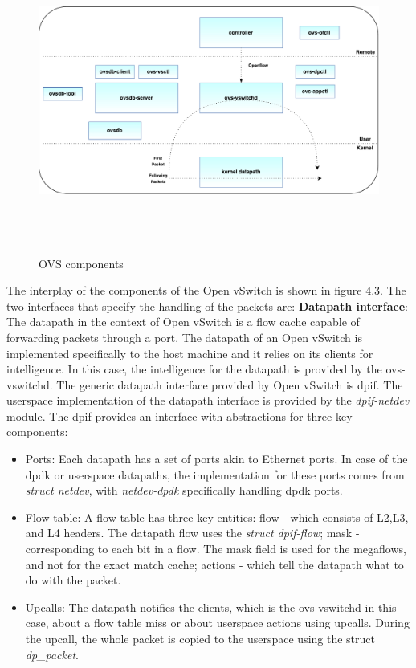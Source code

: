  \begin{figure}[H] 
 	\centering   
	\caption{OVS components}
	\includegraphics[height=10cm]{kernaldatapath.pdf}
\end{figure}

The interplay of the components of the Open vSwitch is shown in figure 4.3. The two interfaces that specify the handling of the packets are:\newline
\textbf{Datapath interface}: The datapath in the context of Open vSwitch is a flow cache capable of forwarding packets through a port. The datapath of an Open vSwitch is implemented specifically to the host machine and it relies on its clients for intelligence. In this case, the intelligence for the datapath is provided by the ovs-vswitchd. The generic datapath interface provided by Open vSwitch is dpif. The userspace implementation of the datapath interface is provided by the \textit{dpif-netdev} module. The dpif provides an interface with abstractions for three key components:
\begin{itemize}
	\item Ports: Each datapath has a set of ports akin to Ethernet ports. In case of the dpdk or userspace datapaths, the implementation for these ports comes from \textit{struct netdev}, with \textit{netdev-dpdk} specifically handling dpdk ports.
	\item Flow table: A flow table has three key entities: flow - which consists of L2,L3, and L4 headers. The datapath flow uses the \textit{struct dpif-flow}; mask - corresponding to each bit in a flow. The mask field is used for the megaflows, and not for the exact match cache; actions - which tell the datapath what to do with the packet.
	\item Upcalls: The datapath notifies the clients, which is the ovs-vswitchd in this case, about a flow table miss or about userspace actions using upcalls. During the upcall, the whole packet is copied to the userspace using the struct \textit{dp_packet}.
\end{itemize}

